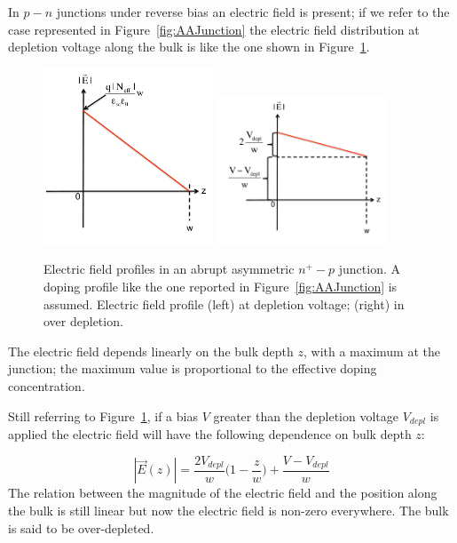 In $p-n$ junctions under reverse bias an electric field is present; if we refer to the case represented 
in Figure~\ref{fig:AAJunction} the electric field distribution at depletion voltage along the bulk is like 
the one shown in Figure~\ref{fig:AAEField}.
\begin{figure}[!htbp]
   \centering
   \includegraphics[width=0.45\textwidth]{E_Abrupt_Junction.pdf} 
    \includegraphics[width=0.45\textwidth]{Overdepleted_E_Abrupt_Junction.pdf}
   \caption{\label{fig:AAEField}Electric field profiles in an abrupt asymmetric $n^+-p$ junction.
   A doping profile like the one reported in Figure~\ref{fig:AAJunction} is assumed. 
   Electric field profile (left) at 
   depletion voltage; (right) in over depletion.}
\end{figure}
The electric field depends linearly on the bulk depth $z$, with a maximum at the 
junction; the maximum value is proportional to the effective doping concentration.

Still referring to Figure~\ref{fig:AAEField}, if a bias $V$ greater than the depletion 
voltage $V_{depl}$ is applied the electric field will 
have the following dependence on bulk depth $z$:

\begin{equation}
|\vec{E}(z)|=\dfrac{2V_{depl}}{w}\Big(1-\dfrac{z}{w}\Big)+\dfrac{V-V_{depl}}{w}
\label{eq:EFz}
\end{equation}
 The relation between the magnitude of the electric field and the position along the bulk is still 
 linear but now the electric field is non-zero everywhere. The bulk is said to be over-depleted.
 
